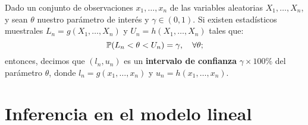 \documentclass[8pt,a4paper]{extarticle}
\begin{document}
\begin{multicols}{3}
	\begin{boxdef}
		Dado un conjunto de observaciones $x_1, \dots, x_n$ de las variables aleatorias $X_1, \dots, X_n$, y sean $\theta$ nuestro parámetro de interés y $\gamma\in(0,1)$. Si existen estadísticos muestrales $L_n = g(X_1, \dots, X_n)$ y $U_n = h(X_1, \dots, X_n)$ tales que: $$\P(L_n < \theta < U_n) = \gamma, \quad \forall \theta;$$ entonces, decimos que $(l_n,u_n)$ es un \textbf{intervalo de confianza} $\gamma \times 100 \%$ del parámetro $\theta$, donde $l_n = g(x_1, \dots, x_n)$ y $u_n = h(x_1, \dots, x_n)$.
	\end{boxdef}

	\newpage
	\section{Inferencia en el modelo lineal}

	\vfill\eject
	\columnbreak
\end{multicols}
\end{document}

